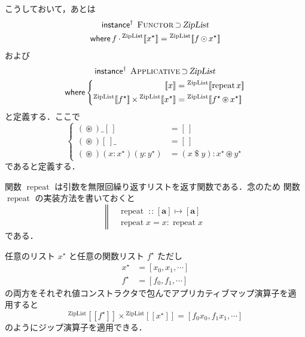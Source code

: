 \documentclass[a5paper,twoside,fleqn,draft]{jsbook}
\def\[{[\![}
\def\]{]\!]}
\newcommand{\mBrace}{\Vert}
\newcommand{\mKeyword}[1]{\mathsf{#1}}
\newcommand{\mInstanceDeclKeyword}{\mKeyword{instance}}
\newcommand{\mWhereKeyword}{\mKeyword{where}}
\DeclareMathOperator{\mInstanceDeclPolymorphic}{\mInstanceDeclKeyword^{\dagger}}
\DeclareMathOperator{\mSuperSet}{\supset}
\DeclareMathOperator{\mWhere}{\mWhereKeyword}
\newcommand{\mEmptyList}{{[\,]}}
\newcommand{\mSpecialFunc}[1]{#1}
\DeclareMathOperator{\mRepeat}{\mSpecialFunc{repeat}}
\DeclareMathOperator{\mApply}{\$}
\DeclareMathOperator{\mAppMap}{\times}
\DeclareMathOperator{\mFuncArrow}{\mapsto}
\DeclareMathOperator{\mIn}{{:\!:}}
\DeclareMathOperator{\mMap}{\cdot}
\DeclareMathOperator{\mMapList}{\odot}
\DeclareMathOperator{\mZip}{\circledast}
\newcommand{\mType}[1]{\mathbf{#1}} %
\newcommand{\mA}{\mType{a}}
\newcommand{\mTypeConstructor}[1]{\textsl{#1}}
\DeclareMathOperator{\mZipListTypeConstructor}{\mTypeConstructor{ZipList}}
\newcommand{\mValueConstructor}[1]{\mathrm{#1}}
\newcommand{\mValueWith}[2]{{}^\mValueConstructor{#1}\[#2\]}
\newcommand{\mZipListWith}[1]{\mValueWith{ZipList}{#1}}
\newcommand{\mPureWith}[1]{\[#1\]}
\newcommand{\mTypeClass}[1]{\textsc{#1}} %
\newcommand{\mApplicativeTypeClass}{\mTypeClass{Applicative}}
\newcommand{\mFunctorTypeClass}{\mTypeClass{Functor}}
\newcommand{\mList}[1]{{#1}^\mathrm{\star}}
\newcommand{\mProjEXP}[2]{#1\mFuncArrow#2} %
\begin{document}
こうしておいて，あとは
\begin{multline}
  \mInstanceDeclPolymorphic\;
  \mFunctorTypeClass\mSuperSet\mZipListTypeConstructor\\
  \mWhere
  f\mMap{}\mZipListWith{\mList{x}}=\mZipListWith{f\mMapList\mList{x}}
\end{multline}
および
\begin{multline}
  \mInstanceDeclPolymorphic\;
  \mApplicativeTypeClass\mSuperSet\mZipListTypeConstructor\\
  \mWhere
  \left\{
  \begin{aligned}
    \mPureWith{x}
    &=\mZipListWith{\mRepeat x}\\
    \mZipListWith{\mList{f}}\mAppMap\mZipListWith{\mList{x}}
    &=\mZipListWith{\mList{f}\mZip\mList{x}}
  \end{aligned}
  \right.
\end{multline}
と定義する．ここで
\begin{equation}
  \label{eq:zip}
  \left\{
  \begin{aligned}
    (\mZip)\_\mEmptyList&=\mEmptyList\\
    (\mZip)\mEmptyList\_&=\mEmptyList\\
    (\mZip)(x:\mList{x})(y:\mList{y})&=(x\mApply y):\mList{x}\mZip\mList{y}
  \end{aligned}
  \right.
\end{equation}
であると定義する．

関数 $\mRepeat$ は引数を無限回繰り返すリストを返す関数である．念のため
関数 $\mRepeat$ の実装方法を書いておくと
\begin{equation}
  \left\mBrace
  \begin{aligned}
    &\mRepeat\mIn{}\mProjEXP{[\mA]}{[\mA]}\\
    &\mRepeat x=x:\mRepeat x
  \end{aligned}
  \right.
\end{equation}
である．

任意のリスト $\mList{x}$ と任意の関数リスト $\mList{f}$ ただし
\begin{align}
\mList{x}&=[x_0,x_1,\dotsb]\\
\mList{f}&=[f_0,f_1,\dotsb]
\end{align}
の両方をそれぞれ値コンストラクタで包んでアプリカティブマップ演算子を適
用すると
\begin{equation}
  \mZipListWith{\mList{f}}\mAppMap\mZipListWith{\mList{x}}
  =[f_0x_0,f_1x_1,\dotsb]
\end{equation}
のようにジップ演算子を適用できる．
\end{document}
